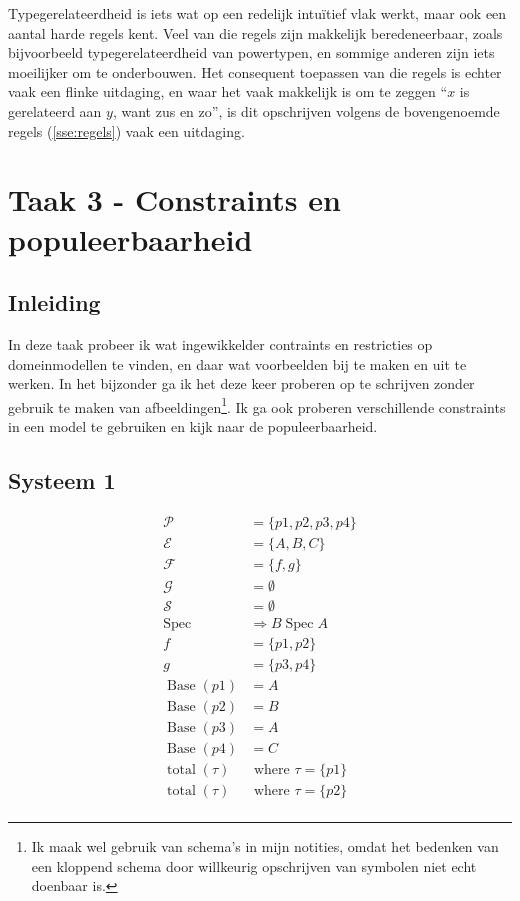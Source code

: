 \documentclass{article}
\newcommand{\Spec}{\ensuremath{\operatorname{Spec}}}
\newcommand{\Base}{\ensuremath{\operatorname{Base}}}
\newcommand{\total}{\ensuremath{\operatorname{total}}}
\begin{document}
Typegerelateerdheid is iets wat op een redelijk intu\"itief vlak werkt,
maar ook een aantal harde regels kent. Veel van die regels zijn makkelijk
beredeneerbaar, zoals bijvoorbeeld typegerelateerdheid van powertypen, en 
sommige anderen zijn iets moeilijker om te onderbouwen. Het consequent toepassen
van die regels is echter vaak een flinke uitdaging, en waar het vaak makkelijk is
om te zeggen ``$x$ is gerelateerd aan $y$, want zus en zo'', is dit opschrijven
volgens de bovengenoemde regels (\ref{sse:regels}) vaak een uitdaging.

\section{Taak 3 - Constraints en populeerbaarheid}

\subsection{Inleiding}

In deze taak probeer ik wat ingewikkelder contraints en restricties op
domeinmodellen te vinden, en daar wat voorbeelden bij te maken en uit te
werken. In het bijzonder ga ik het deze keer proberen op te schrijven zonder
gebruik te maken van afbeeldingen\footnote{Ik maak wel gebruik van schema's in
mijn notities, omdat het bedenken van een kloppend schema door willkeurig
opschrijven van symbolen niet echt doenbaar is.}. Ik ga ook proberen
verschillende constraints in een model te gebruiken en kijk naar de
populeerbaarheid.

\subsection{Systeem 1}
\begin{align*}
  \mathcal{P}    & = \{p1,p2,p3,p4\}\\
  \mathcal{E} & = \{A,B,C\} \\
  \mathcal{F} & = \{f,g\}   \\
  \mathcal{G} & = \emptyset        \\  
  \mathcal{S} & = \emptyset        \\
  \Spec       &\Rightarrow B \Spec A       \\
  f           & = \{p1,p2\} \\   
  g           & = \{p3,p4\} \\
  \Base (p1)   & = A         \\
  \Base (p2)   & = B         \\
  \Base (p3)   & = A         \\
  \Base (p4)   & = C        \\ 
  \total (\tau) &\text{ where } \tau = \{p1\} \\
  \total (\tau) &\text{ where } \tau = \{p2\} \\
\end{align*}
\end{document}
